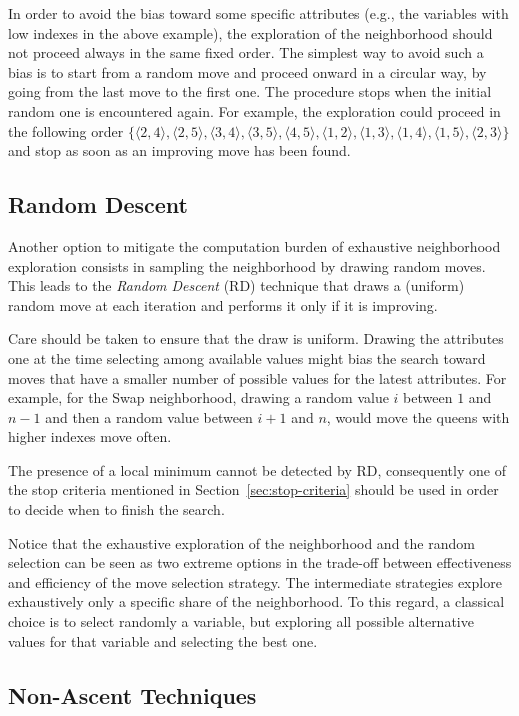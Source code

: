 In order to avoid the bias toward some specific attributes (e.g., the variables
with low indexes in the above example), the exploration of the
neighborhood should not proceed always in the same fixed order. The
simplest way to avoid such a bias is to start from a random move and
proceed onward in a circular way, by going from the last move to the first one. The procedure stops when the initial
random one is encountered again. For example, the exploration could proceed in the
following order $\{\langle 2,4\rangle,
\langle 2,5\rangle, \langle 3,4\rangle, \langle 3,5\rangle, \langle
4,5\rangle, \langle 1,2\rangle, \langle 1,3\rangle, \langle
1,4\rangle, \langle 1,5\rangle, \langle 2,3\rangle\}$ and stop as soon as an improving move has been found.

\subsection{Random Descent}

Another option to mitigate the computation burden of exhaustive neighborhood exploration 
consists in sampling the neighborhood by drawing random moves. This leads to
the \emph{Random Descent} (RD) technique that draws a (uniform) random move
at each iteration and performs it only if it is improving. 

Care should be taken to ensure that the draw is uniform. Drawing the attributes one at 
the time selecting among available values might bias the search toward moves 
that have a smaller number of possible values for the latest attributes.
For example, for the \textsf{Swap} neighborhood, drawing a random value $i$ between $1$ and 
$n-1$ and then a random value between $i+1$ and $n$, would move the queens with higher indexes move often.


The presence of a local minimum cannot be detected by RD, consequently one of
the stop criteria mentioned in Section~\ref{sec:stop-criteria} should
be used in order to decide when to finish the search.

Notice that the exhaustive exploration of the neighborhood and the random
selection can be seen as two extreme options in the trade-off between
effectiveness and efficiency of the move selection strategy. The
intermediate strategies explore exhaustively only a specific share of the
neighborhood. To this regard, a classical choice is to select randomly
a variable, but exploring all possible alternative values for that
variable and selecting the best one.


\subsection{Non-Ascent Techniques}

